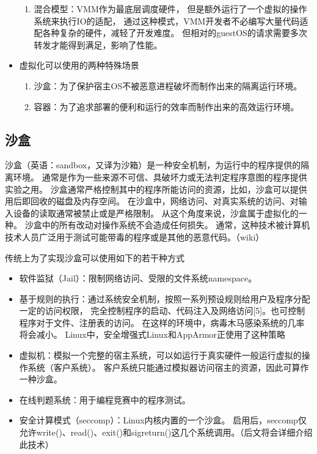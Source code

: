 \documentclass[AutoFakeBold,a4paper]{ctexart}
\begin{document}
\begin{itemize}
\begin{enumerate}
        \item 混合模型：VMM作为最底层调度硬件，
        但是额外运行了一个虚拟的操作系统来执行IO的适配，
        通过这种模式，VMM开发者不必编写大量代码适配各种复杂的硬件，减轻了开发难度。
        但相对的guestOS的请求需要多次转发才能得到满足，影响了性能。
    \end{enumerate}
    \item 虚拟化可以使用的两种特殊场景
    \begin{enumerate}
        \item 沙盒：为了保护宿主OS不被恶意进程破坏而制作出来的隔离运行环境。
        \item 容器：为了追求部署的便利和运行的效率而制作出来的高效运行环境。
    \end{enumerate}
\end{itemize}

\subsection{沙盒}
沙盒（英语：sandbox，又译为沙箱）是一种安全机制，为运行中的程序提供的隔离环境。
通常是作为一些来源不可信、具破坏力或无法判定程序意图的程序提供实验之用。
沙盒通常严格控制其中的程序所能访问的资源，比如，沙盒可以提供用后即回收的磁盘及内存空间。
在沙盒中，网络访问、对真实系统的访问、对输入设备的读取通常被禁止或是严格限制。
从这个角度来说，沙盒属于虚拟化的一种。
沙盒中的所有改动对操作系统不会造成任何损失。
通常，这种技术被计算机技术人员广泛用于测试可能带毒的程序或是其他的恶意代码。（wiki）


\item 传统上为了实现沙盒可以使用如下的若干种方式
\begin{itemize}
    \item 软件监狱（Jail）：限制网络访问、受限的文件系统namespace。
    \item 基于规则的执行：通过系统安全机制，按照一系列预设规则给用户及程序分配一定的访问权限，
    完全控制程序的启动、代码注入及网络访问[5]。也可控制程序对于文件、注册表的访问。
    在这样的环境中，病毒木马感染系统的几率将会减小。
    Linux中，安全增强式Linux和AppArmor正使用了这种策略
    \item 虚拟机：模拟一个完整的宿主系统，可以如运行于真实硬件一般运行虚拟的操作系统（客户系统）。
    客户系统只能通过模拟器访问宿主的资源，因此可算作一种沙盒。
    \item 在线判题系统：用于编程竞赛中的程序测试。
    \item 安全计算模式（seccomp）：Linux内核内置的一个沙盒。
    启用后，seccomp仅允许write()、read()、exit()和sigreturn()这几个系统调用。（后文将会详细介绍此技术）

\end{itemize}
\end{document}
